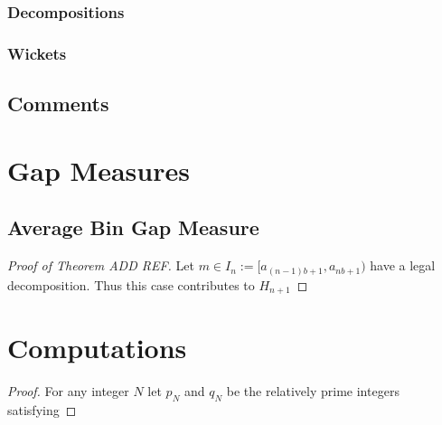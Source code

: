 \documentclass[12pt,reqno]{amsart} %
\begin{document}
\subsubsection{Decompositions}


\lipsum[6]

\subsubsection{Wickets}

\lipsum[3]

\subsection{Comments}

\lipsum[2]


\section{Gap Measures}

\subsection{Average Bin Gap Measure}\label{sec:gaps}

\begin{proof}[Proof of Theorem ADD REF]
Let $m \in I_n:= [a_{(n-1)b+1},a_{nb+1})$ have a legal decomposition.
Thus this case contributes to $H_{n+1}$

\end{proof}

\renewcommand{\mkbibnamefamily}[1]{\textsc{#1}}
\printbibliography

\appendix


\section{Computations}

\begin{proof} For any integer $N$ let $p_N$ and $q_N$ be the
relatively prime integers satisfying
\lipsum[10]

\end{proof}


\medskip
\end{document}
